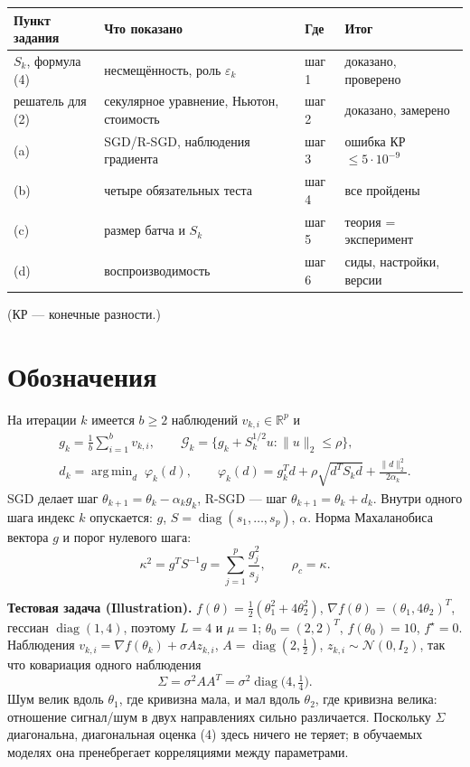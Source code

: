 \documentclass[11pt,a4paper]{article}
\newcommand{\G}{\mathcal{G}_k}
\newcommand{\norm}[1]{\lVert #1\rVert_2}
\DeclareMathOperator*{\argmin}{arg\,min}
\DeclareMathOperator{\diag}{diag}
\begin{document}
\begin{center}
\begin{tabular}{@{}llll@{}}
\toprule
Пункт задания & Что показано & Где & Итог \\
\midrule
$S_k$, формула (4) & несмещённость, роль $\varepsilon_k$ & шаг 1 & доказано, проверено \\
решатель для (2) & секулярное уравнение, Ньютон, стоимость & шаг 2 & доказано, замерено \\
(a) & SGD/R-SGD, наблюдения градиента & шаг 3 & ошибка КР $\le 5\cdot10^{-9}$ \\
(b) & четыре обязательных теста & шаг 4 & все пройдены \\
(c) & размер батча и $S_k$ & шаг 5 & теория = эксперимент \\
(d) & воспроизводимость & шаг 6 & сиды, настройки, версии \\
\bottomrule
\end{tabular}
\end{center}
(КР — конечные разности.)

\section*{Обозначения}

На итерации $k$ имеется $b\ge2$ наблюдений $v_{k,i}\in\mathbb R^p$ и
\begin{gather*}
g_k=\frac1b\sum_{i=1}^b v_{k,i},\qquad
\G=\{g_k+S_k^{1/2}u:\norm{u}\le\rho\},\\
d_k=\argmin_d\;\varphi_k(d),\qquad
\varphi_k(d)=g_k^Td+\rho\sqrt{d^TS_kd}+\frac{\norm{d}^2}{2\alpha_k}.
\end{gather*}
SGD делает шаг $\theta_{k+1}=\theta_k-\alpha_kg_k$, R-SGD — шаг
$\theta_{k+1}=\theta_k+d_k$. Внутри одного шага индекс $k$ опускается: $g$,
$S=\diag(s_1,\dots,s_p)$, $\alpha$. Норма Махаланобиса вектора $g$ и порог нулевого
шага:
\begin{equation*}
\kappa^2=g^TS^{-1}g=\sum_{j=1}^p\frac{g_j^2}{s_j},\qquad \rho_c=\kappa .
\end{equation*}

\textbf{Тестовая задача (Illustration).}
$f(\theta)=\tfrac12(\theta_1^2+4\theta_2^2)$, $\nabla f(\theta)=(\theta_1,4\theta_2)^T$,
гессиан $\diag(1,4)$, поэтому $L=4$ и $\mu=1$; $\theta_0=(2,2)^T$, $f(\theta_0)=10$,
$f^\star=0$. Наблюдения $v_{k,i}=\nabla f(\theta_k)+\sigma Az_{k,i}$, $A=\diag(2,\tfrac12)$,
$z_{k,i}\sim\mathcal N(0,I_2)$, так что ковариация одного наблюдения
\begin{equation*}
\Sigma=\sigma^2AA^T=\sigma^2\diag\big(4,\tfrac14\big).
\end{equation*}
Шум велик вдоль $\theta_1$, где кривизна мала, и мал вдоль $\theta_2$, где кривизна
велика: отношение сигнал/шум в двух направлениях сильно различается. Поскольку
$\Sigma$ диагональна, диагональная оценка (4) здесь ничего не теряет; в обучаемых
моделях она пренебрегает корреляциями между параметрами.
\end{document}
